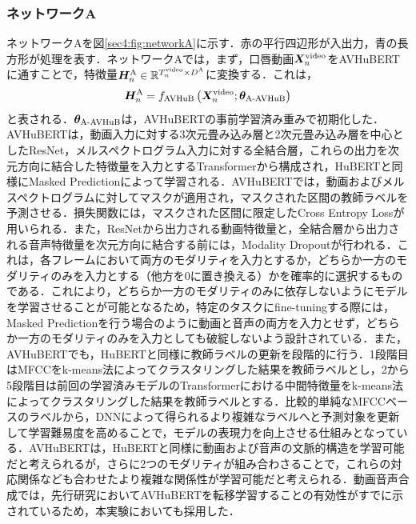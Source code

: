 \subsubsection{ネットワークA}
ネットワークAを図\ref{sec4:fig:networkA}に示す．赤の平行四辺形が入出力，青の長方形が処理を表す．ネットワークAでは，まず，口唇動画$\bm{X}^{\text{video}}_{n}$をAVHuBERTに通すことで，特徴量$\bm{H}^{\text{A}}_{n} \in \mathbb{R}^{T^{\text{video}}_{n} \times D^{\text{A}}}$に変換する．これは，
\begin{equation}
    \bm{H}^{\text{A}}_{n} = f_{\text{AVHuB}}\left(\bm{X}^{\text{video}}_{n}; \bm{\theta}_{\text{A-AVHuB}}\right)
\end{equation}
と表される．$\bm{\theta}_{\text{A-AVHuB}}$は，AVHuBERTの事前学習済み重みで初期化した．AVHuBERTは，動画入力に対する3次元畳み込み層と2次元畳み込み層を中心としたResNet，メルスペクトログラム入力に対する全結合層，これらの出力を次元方向に結合した特徴量を入力とするTransformerから構成され，HuBERTと同様にMasked Predictionによって学習される．AVHuBERTでは，動画およびメルスペクトログラムに対してマスクが適用され，マスクされた区間の教師ラベルを予測させる．損失関数には，マスクされた区間に限定したCross Entropy Lossが用いられる．また，ResNetから出力される動画特徴量と，全結合層から出力される音声特徴量を次元方向に結合する前には，Modality Dropoutが行われる．これは，各フレームにおいて両方のモダリティを入力とするか，どちらか一方のモダリティのみを入力とする（他方を0に置き換える）かを確率的に選択するものである．これにより，どちらか一方のモダリティのみに依存しないようにモデルを学習させることが可能となるため，特定のタスクにfine-tuningする際には，Masked Predictionを行う場合のように動画と音声の両方を入力とせず，どちらか一方のモダリティのみを入力としても破綻しないよう設計されている．また，AVHuBERTでも，HuBERTと同様に教師ラベルの更新を段階的に行う．1段階目はMFCCをk-means法によってクラスタリングした結果を教師ラベルとし，2から5段階目は前回の学習済みモデルのTransformerにおける中間特徴量をk-means法によってクラスタリングした結果を教師ラベルとする．比較的単純なMFCCベースのラベルから，DNNによって得られるより複雑なラベルへと予測対象を更新して学習難易度を高めることで，モデルの表現力を向上させる仕組みとなっている．AVHuBERTは，HuBERTと同様に動画および音声の文脈的構造を学習可能だと考えられるが，さらに2つのモダリティが組み合わさることで，これらの対応関係なども合わせたより複雑な関係性が学習可能だと考えられる．動画音声合成では，先行研究においてAVHuBERTを転移学習することの有効性がすでに示されているため，本実験においても採用した．

